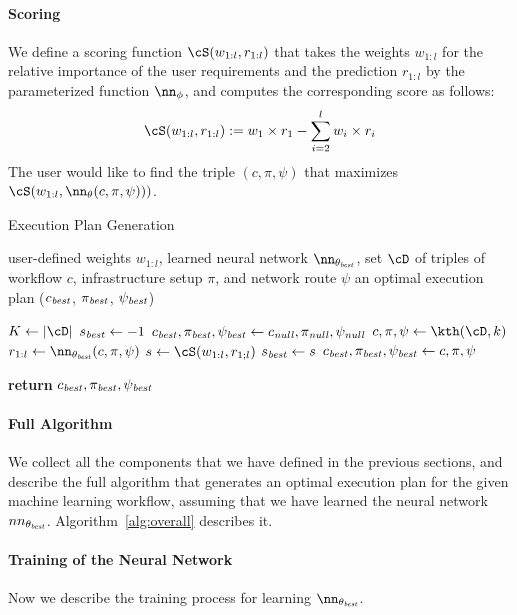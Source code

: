 \documentclass[runningheads]{llncs}
\begin{document}
\paragraph{Scoring}
\label{sec:scoring}
We define a scoring function $\cS(w_{1:l}, r_{1:l})$ that takes the weights $w_{1:l}$ for the relative importance of the user requirements and the prediction $r_{1:l}$ by the parameterized function $\nn_\phi$, and computes the corresponding score as follows:
\[
\cS(w_{1:l}, r_{1:l}) := w_1 \times r_1 - \sum_{i=2}^{l} w_i \times r_i 
\]
The user would like to find the triple $(c, \pi, \psi)$ that maximizes $\cS(w_{1:l}, \nn_\theta(c, \pi, \psi)))$.

\begin{algorithm}[t]
	\caption{Execution Plan Generation}
	\label{alg:overall}
	\begin{algorithmic}[1]
		\Require user-defined weights $w_{1:l}$, learned neural network $\nn_{\theta_{\it best}}$, set $\cD$ of triples of workflow $c$, infrastructure setup $\pi$, and network route $\psi$
		\Ensure an optimal execution plan ($c_{\it best}$, $\pi_{\it best}$, $\psi_{\it best}$)
		
		\State $K \gets |\cD|$
		\State $s_{\it best} \gets -1$
		\State $c_{\it best}, \pi_{\it best}, \psi_{\it best} \gets c_{\it null}, \pi_{\it null}, \psi_{\it null}$
			\State $c, \pi, \psi \gets \kth(\cD, k)$
			\State $r_{1:l} \gets \nn_{\theta_{\it best}}(c, \pi, \psi)$
			\State $s \gets \cS(w_{1:l}, r_{1;l})$
				\State $s_{\it best} \gets s$
				\State $c_{\it best}, \pi_{\it best}, \psi_{\it best} \gets c, \pi, \psi$
			\EndIf
		\EndFor
		
		\State \textbf{return} $c_{\it best}, \pi_{\it best}, \psi_{\it best}$
	\end{algorithmic}
\end{algorithm}

\paragraph{Full Algorithm}
\label{sec:algorithm}
We collect all the components that we have defined in the previous sections, and describe the full algorithm that generates an optimal execution plan for the given machine learning workflow, assuming that we have learned the neural network $nn_{\theta_{\it best}}$. Algorithm~\ref{alg:overall} describes it.

\paragraph{Training of the Neural Network}
Now we describe the training process for learning $\nn_{\theta_{\it best}}$.

\fi



\end{document}
